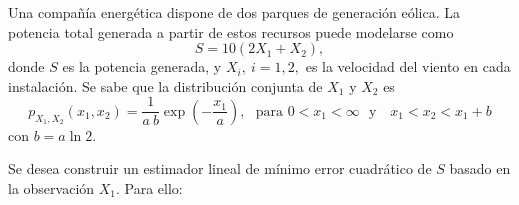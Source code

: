 Una compañía energética dispone de dos parques de generación eólica. La potencia total generada a partir de estos recursos puede modelarse como
$$S = 10 (2 X_1 + X_2),$$
donde $S$ es la potencia generada, y $X_i,~i=1, 2,$ es la velocidad del viento en cada instalación. Se sabe que la distribución conjunta de $X_1$ y $X_2$ es
\begin{equation}
	p_{X_1,X_2}(x_1,x_2) = \frac{1}{a~b} \exp\left(-\frac{x_1}{a}\right), ~~~\text{para } 0<x_1<\infty ~~~\text{y }~~~x_1 < x_2 < x_1 + b
\end{equation}
con $b = a \ln 2$. 

Se desea construir un estimador lineal de mínimo error cuadrático de $S$ basado en la observación ${X_1}$. Para ello:


\begin{solution}
\end{solution}


